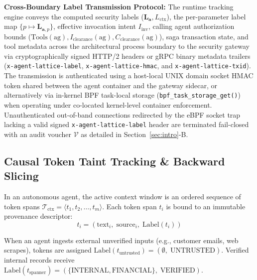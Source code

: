 \documentclass[conference,10pt]{IEEEtran}
\begin{document}
\noindent\textbf{Cross-Boundary Label Transmission Protocol:} The runtime tracking engine conveys the computed security labels ($\mathbf{L}_{\mathbf{a}}, L_{\text{ctx}}$), the per-parameter label map $\{p \mapsto \mathbf{L}_{\mathbf{a}, p}\}$, effective invocation intent $I_{\text{inv}}$, calling agent authorization bounds ($\text{Tools}(\text{ag}), I_{\text{clearance}}(\text{ag}), C_{\text{clearance}}(\text{ag})$), saga transaction state, and tool metadata across the architectural process boundary to the security gateway via cryptographically signed HTTP/2 headers or gRPC binary metadata trailers (\texttt{x-agent-lattice-label}, \texttt{x-agent-lattice-hmac}, and \texttt{x-agent-lattice-txid}). The transmission is authenticated using a host-local UNIX domain socket HMAC token shared between the agent container and the gateway sidecar, or alternatively via in-kernel BPF task-local storage (\texttt{bpf\_task\_storage\_get()}) when operating under co-located kernel-level container enforcement. Unauthenticated out-of-band connections redirected by the eBPF socket trap lacking a valid signed \texttt{x-agent-lattice-label} header are terminated fail-closed with an audit voucher $\mathcal{V}$ as detailed in Section~\ref{sec:intro}-B.

\subsection{Causal Token Taint Tracking \& Backward Slicing}
In an autonomous agent, the active context window is an ordered sequence of token spans $\mathcal{T}_{\text{ctx}} = \langle t_1, t_2, \dots, t_m \rangle$. Each token span $t_i$ is bound to an immutable provenance descriptor:
\begin{equation}
t_i = (\text{text}_i, \; \text{source}_i, \; \text{Label}(t_i))
\end{equation}

When an agent ingests external unverified inputs (e.g., customer emails, web scrapes), tokens are assigned $\text{Label}(t_{\text{untrusted}}) = (\emptyset, \; \text{UNTRUSTED})$. Verified internal records receive $\text{Label}(t_{\text{spanner}}) = (\{\text{INTERNAL}, \text{FINANCIAL}\}, \; \text{VERIFIED})$.
\end{document}
